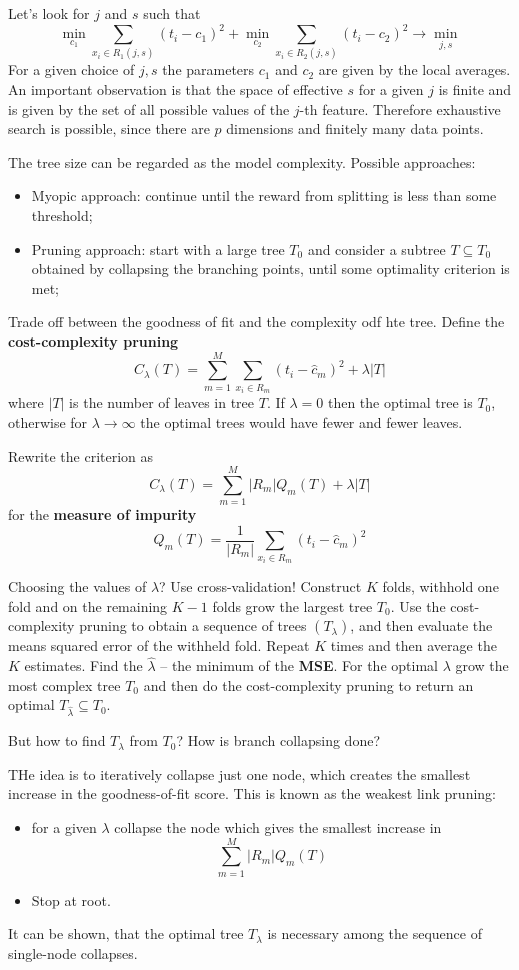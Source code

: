\documentclass[a4paper]{article}
\begin{document}
Let's look for $j$ and $s$ such that 
\[
  \min_{c_1}\sum_{x_i\in R_1(j,s)} (t_i - c_1)^2
+ \min_{c_2}\sum_{x_i\in R_2(j,s)} (t_i - c_2)^2
\to \min_{j,s}
\]
For a given choice of $j,s$ the parameters $c_1$ and $c_2$ are given by the local
averages. An important observation is that the space of effective $s$ for a given $j$
is finite and is given by the set of all possible values of the $j$-th feature.
Therefore exhaustive search is possible, since there are $p$ dimensions and finitely
many data points.

The tree size can be regarded as the model complexity. Possible approaches:
\begin{itemize}
	\item Myopic approach: continue until the reward from splitting is less than
	some threshold;
	\item Pruning approach: start with a large tree $T_0$ and consider a subtree
	$T\subseteq T_0$ obtained by collapsing the branching points, until some
	optimality criterion is met;
\end{itemize}

Trade off between the goodness of fit and the complexity odf hte tree.
Define the \textbf{cost-complexity pruning}
\[C_\lambda(T) = \sum_{m=1}^M\sum_{x_i\in R_m} (t_i - \hat{c}_m)^2 + \lambda |T| \]
where $|T|$ is the number of leaves in tree $T$. If $\lambda=0$ then the optimal
tree is $T_0$, otherwise for $\lambda\to \infty$ the optimal trees would have
fewer and fewer leaves.

Rewrite the criterion as
\[C_\lambda(T) = \sum_{m=1}^M |R_m| Q_m(T)+ \lambda |T| \]
for the \textbf{measure of impurity}
\[Q_m(T) = \frac{1}{|R_m|}\sum_{x_i\in R_m} (t_i - \hat{c}_m)^2\]

Choosing the values of $\lambda$? Use cross-validation! Construct $K$ folds, withhold
one fold and on the remaining $K-1$ folds grow the largest tree $T_0$.
Use the cost-complexity pruning to obtain a sequence of trees $(T_\lambda)$, and then
evaluate the means squared error of the withheld fold. Repeat $K$ times and then average
the $K$ estimates. Find the $\hat{\lambda}$ -- the minimum of the \textbf{MSE}.
For the optimal $\lambda$ grow the most complex tree $T_0$ and then do the cost-complexity
pruning to return an optimal $T_{\hat{\lambda}}\subseteq T_0$.

But how to find $T_\lambda$ from $T_0$? How is branch collapsing done?

THe idea is to iteratively collapse just one node, which creates the smallest increase
in the goodness-of-fit score. This is known as the weakest link pruning:
\begin{itemize}
	\item for a given $\lambda$ collapse the node which gives the smallest increase in
	\[\sum_{m=1}^M |R_m| Q_m(T)\]
	\item Stop at root.
\end{itemize}
It can be shown, that the optimal tree $T_\lambda$ is necessary among the sequence of
single-node collapses.
\end{document}
